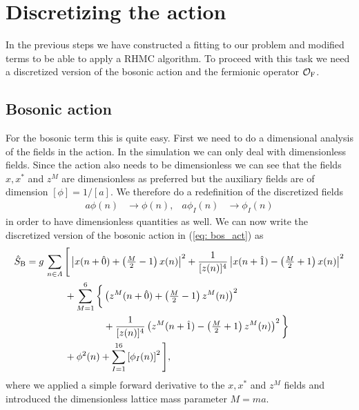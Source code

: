\section{Discretizing the action}
In the previous steps we have constructed a  fitting to our problem and modified terms to be able to apply a RHMC algorithm. To proceed with this task we need a discretized version of the bosonic action and the fermionic operator $\mathcal{O}_{\rm F}$.
%
%
%
%
%
%
\subsection{Bosonic action}
For the bosonic term this is quite easy. First we need to do a dimensional analysis of the fields in the action. In the simulation we can only deal with dimensionless fields. Since the action also needs to be dimensionless we can see that the fields $x,x^{*}$ and $z^{M}$ are dimensionless as preferred but the auxiliary fields are of dimension $[\phi]=1/[a]$. We therefore do a redefinition of the discretized fields
%
%
\begin{align}
a\phi(n) &\to \phi(n), & a\phi_{I}(n) &\to \phi_{I}(n)
\end{align}
%
%
in order to have dimensionless quantities as well. We can now write the discretized version of the bosonic action in (\ref{eq: bos_act}) as
%
%
\begin{align}
\hat{S}_{\rm B} &= g\, \sum\limits_{n\in\mathit{\Lambda}} \Bigg[ \left\vert x(n+\hat{0}) + \left(\tfrac{M}{2}-1\right) x(n) \right\vert^{2}
+ \frac{1}{[z(n)]^{4}} \left\vert x(n+\hat{1}) - \left(\tfrac{M}{2}+1\right) x(n) \right\vert^{2} \notag\\
%
%
&\qquad\qquad + \sum\limits_{M=1}^{6} \bigg\lbrace \left(z^{M}(n+\hat{0}) + \left(\tfrac{M}{2} -1\right)z^{M}(n) \right)^{2} \\
%
%
&\qquad\qquad\qquad\qquad + \frac{1}{[z(n)]^{4}} \left( z^{M}(n+\hat{1}) -\left(\tfrac{M}{2}+1\right) z^{M}(n) \right)^{2} \bigg\rbrace \notag \\
&\qquad\qquad +\phi^{2}(n) + \sum\limits_{I=1}^{16}\left[\phi_{I}(n)\right]^{2} \Bigg], \notag
\end{align}
%
%
where we applied a simple forward derivative to the $x,x^{*}$ and $z^{M}$ fields and introduced the dimensionless lattice mass parameter $M=ma$.
%
%
%
%
%
%
%
%

